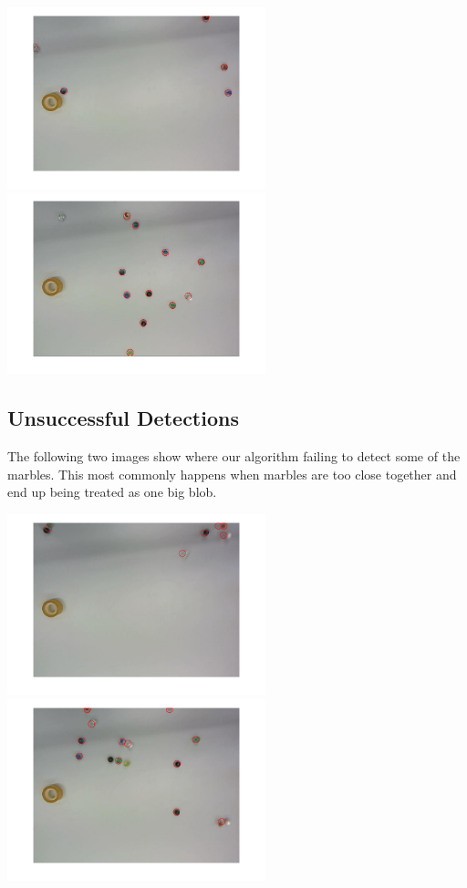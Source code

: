 \documentclass[10pt,a4paper,onecolumn]{report}
\begin{document}
\begin{center}
\includegraphics[width=7.5cm]{identification_1.png}
\includegraphics[width=7.5cm]{identification_2.png}
\end{center}

\subsection{Unsuccessful Detections}

The following two images show where our algorithm failing to detect some of the marbles. This most commonly happens when marbles are too close together and end up being treated as one big blob. 

\begin{center}
\includegraphics[width=7.5cm]{misidentification_1.png}
\includegraphics[width=7.5cm]{misidentification_2.png}
\end{center}
\end{document}

